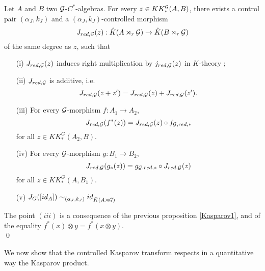 \begin{prop}\label{Kasparov}
Let $A$ and $B$ two $\mathcal G$-$C^*$-algebras. For every $z\in KK^\mathcal G_*(A,B)$, there exists a control pair $(\alpha_J,k_J)$ and a $(\alpha_J,k_J)$-controlled morphism
\[J_{red,\mathcal G}(z) : \hat K(A\rtimes_r \mathcal G)\rightarrow \hat K(B\rtimes_r \mathcal G)\]
of the same degree as $z$, such that
\begin{enumerate}
\item[(i)] $J_{red,\mathcal G}(z)$ induces right multiplication by $j_{red,\mathcal G}(z)$ in $K$-theory ;
\item[(ii)] $J_{red,\mathcal G}$ is additive, i.e.
\[J_{red,\mathcal G}(z+z')=J_{red,\mathcal G}(z)+J_{red,\mathcal G}(z').\]
\item[(iii)] For every $\mathcal G$-morphism $f : A_1\rightarrow A_2$,
\[J_{red,\mathcal G}(f^*(z))=J_{red,\mathcal G}(z)\circ f_{\mathcal G,red,*}\] for all $z\in KK_*^G(A_2,B)$.
\item[(iv)] For every $\mathcal G$-morphism $g : B_1\rightarrow B_2$,
\[J_{red,\mathcal G}(g_*(z))= g_{\mathcal G,red,*}\circ J_{red,\mathcal G}(z)\] for all $z\in KK_*^G(A,B_1)$.
\item[(v)] $J_G([id_A]) \sim_{(\alpha_J,k_J)} id_{\hat K(A\rtimes \mathcal G)}$
\end{enumerate}
\end{prop}

\begin{dem}
The point $(iii)$ is a consequence of the previous proposition \ref{Kasparov1}, and of the equality $f^*(x)\otimes y = f^*(x\otimes y)$.\\
\qed
\end{dem}

We now show that the controlled Kasparov transform respects in a quantitative way the Kasparov product.

